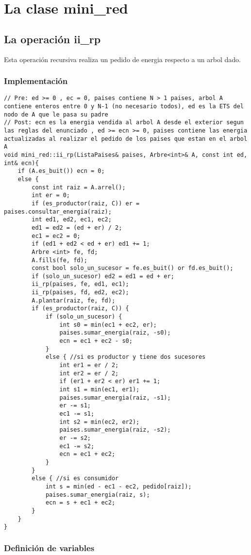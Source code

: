 \documentclass[10pt]{article}
\begin{document}
\maketitle
\section{La clase mini\_red}
\subsection{La operación ii\_rp}
Esta operación recursiva realiza un pedido de energia respecto a un arbol dado.
\subsubsection{Implementación}
\begin{lstlisting}
// Pre: ed >= 0 , ec = 0, paises contiene N > 1 paises, arbol A contiene enteros entre 0 y N-1 (no necesario todos), ed es la ETS del nodo de A que le pasa su padre
// Post: ecn es la energia vendida al arbol A desde el exterior segun las reglas del enunciado , ed >= ecn >= 0, paises contiene las energia actualizadas al realizar el pedido de los paises que estan en el arbol A
void mini_red::ii_rp(ListaPaises& paises, Arbre<int>& A, const int ed, int& ecn){
	if (A.es_buit()) ecn = 0;
	else {
		const int raiz = A.arrel();
		int er = 0;
		if (es_productor(raiz, C)) er = paises.consultar_energia(raiz);
		int ed1, ed2, ec1, ec2;
		ed1 = ed2 = (ed + er) / 2;
		ec1 = ec2 = 0;
		if (ed1 + ed2 < ed + er) ed1 += 1;
		Arbre <int> fe, fd;
		A.fills(fe, fd);
		const bool solo_un_sucesor = fe.es_buit() or fd.es_buit();
		if (solo_un_sucesor) ed2 = ed1 = ed + er;
		ii_rp(paises, fe, ed1, ec1);
		ii_rp(paises, fd, ed2, ec2);
		A.plantar(raiz, fe, fd);
		if (es_productor(raiz, C)) {
			if (solo_un_sucesor) {
				int s0 = min(ec1 + ec2, er);
				paises.sumar_energia(raiz, -s0);
				ecn = ec1 + ec2 - s0;
			}
			else { //si es productor y tiene dos sucesores
				int er1 = er / 2;
				int er2 = er / 2;
				if (er1 + er2 < er) er1 += 1;
				int s1 = min(ec1, er1);
				paises.sumar_energia(raiz, -s1);
				er -= s1;
				ec1 -= s1;
				int s2 = min(ec2, er2);
				paises.sumar_energia(raiz, -s2);
				er -= s2;
				ec1 -= s2;
				ecn = ec1 + ec2;
			}
		} 
		else { //si es consumidor
			int s = min(ed - ec1 - ec2, pedido[raiz]);
			paises.sumar_energia(raiz, s);
			ecn = s + ec1 + ec2;
		}
	}
}

\end{lstlisting}
\subsubsection{Definición de variables}
\end{document}
